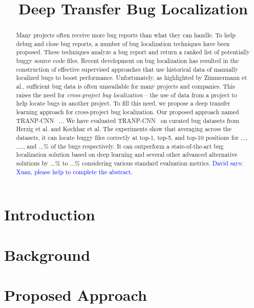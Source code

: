 \documentclass[sigconf]{acmart}
\newcommand{\dl}[1]{\textcolor{blue}{{David says: {#1}}}}
\newcommand{\TRANPCNN}{TRANP-CNN }
\begin{document}
\title{Deep Transfer Bug Localization}

\begin{abstract}
Many projects often receive more bug reports than what they can handle. To help debug and close bug reports, a number of bug localization techniques have been proposed. These techniques analyze a bug report and return a ranked list of potentially buggy source code files. Recent development on bug localization has resulted in the construction of effective supervised approaches that use historical data of manually localized bugs to boost performance. Unfortunately, as highlighted by Zimmermann et al., sufficient bug data is often unavailable for many projects and companies. This raises the need for {\em cross-project bug localization} -- the use of data from a project to help locate bugs in another project. To fill this need, we propose a deep transfer learning approach for cross-project bug localization. Our proposed approach named \TRANPCNN\ ... We have evaluated \TRANPCNN\ on curated bug datasets from Herzig et al. and Kochhar et al. The experiments show that averaging across the datasets, it can locate buggy files correctly at top-1, top-5, and top-10 positions for ..., ...., and ...\% of the bugs respectively. It can outperform a state-of-the-art bug localization solution based on deep learning and several other advanced alternative solutions by ...\% to ...\% considering various standard evaluation metrics. \dl{Xuan, please help to complete the abstract.}
\end{abstract}

\maketitle

\section{Introduction}\label{sec.intro}


\section{Background}\label{sec.background}


\section{Proposed Approach}\label{sec.approach}

\end{document}
